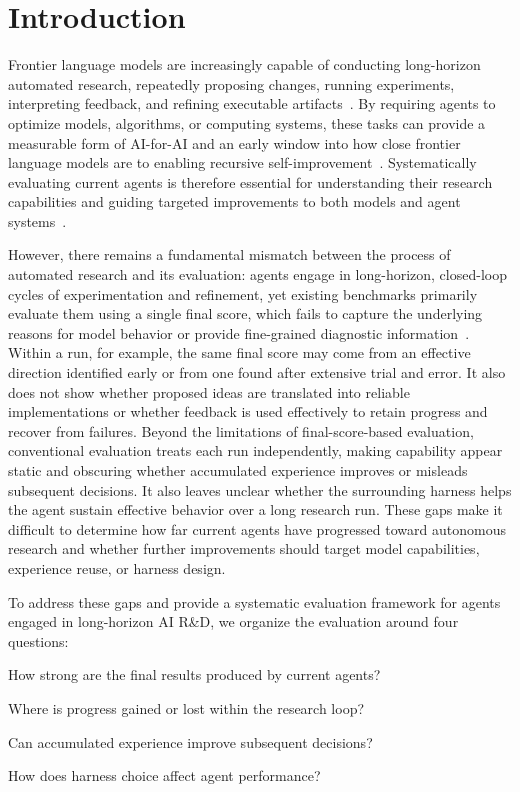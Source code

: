 \section{Introduction}
\label{sec:intro}

Frontier language models are increasingly capable of conducting long-horizon automated research, repeatedly proposing changes, running experiments, interpreting feedback, and refining executable artifacts~\citep{MLAgentBench2024Huang, REbench2025Wijk, xu2026autolab}.
By requiring agents to optimize models, algorithms, or computing systems, these tasks can provide a measurable form of AI-for-AI and an early window into how close frontier language models are to enabling recursive self-improvement~\citep{chan2025mlebench, posttrainbench_2026, lyu2026mlsbench}.
Systematically evaluating current agents is therefore essential for understanding their research capabilities and guiding targeted improvements to both models and agent systems~\citep{REbench2025Wijk, meng2026scientistone}.


However, there remains a fundamental mismatch between the process of automated research and its evaluation: agents engage in long-horizon, closed-loop cycles of experimentation and refinement, yet existing benchmarks primarily evaluate them using a single final score, which fails to capture the underlying reasons for model behavior or provide fine-grained diagnostic information~\citep{MLAgentBench2024Huang, chan2025mlebench, REbench2025Wijk}.
Within a run, for example, the same final score may come from an effective direction identified early or from one found after extensive trial and error.
It also does not show whether proposed ideas are translated into reliable implementations or whether feedback is used effectively to retain progress and recover from failures.
Beyond the limitations of final-score-based evaluation, conventional evaluation treats each run independently, making capability appear static and obscuring whether accumulated experience improves or misleads subsequent decisions.
It also leaves unclear whether the surrounding harness helps the agent sustain effective behavior over a long research run.
These gaps make it difficult to determine how far current agents have progressed toward autonomous research and whether further improvements should target model capabilities, experience reuse, or harness design.


To address these gaps and provide a systematic evaluation framework for agents engaged in long-horizon AI R\&D, we organize the evaluation around four questions:
\begin{enumerate*}
    \item[\ding{182}] How strong are the final results produced by current agents?
    \item[\ding{183}] Where is progress gained or lost within the research loop?
    \item[\ding{184}] Can accumulated experience improve subsequent decisions?
    \item[\ding{185}] How does harness choice affect agent performance?
\end{enumerate*}


